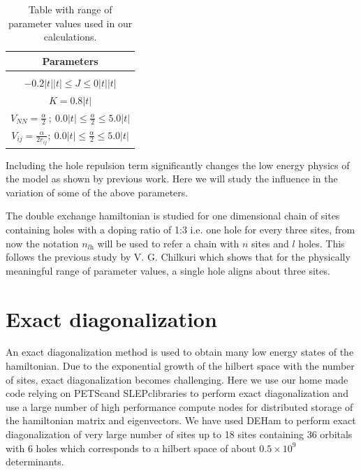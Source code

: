 \documentclass[12pt,twoside]{report}
\newcommand{\citepetsc}{\cite{petsc_web_page,petsc_user_ref,petsc_efficient}}
\newcommand{\citeslepc}{\cite{Hernandez_2003_SSL,slepc_users_manual}}
\begin{document}
	\begin{table}[h!]
		\centering
		\begin{tabular}{||c||}
			\hline
			Parameters  \\ [0.5ex]
			\hline\hline
			\\
			$ -0.2|t|\lvert t \rvert \le J \le 0|t|\lvert t \rvert $    \\ [1ex]
			$  K = 0.8 |t| $                                    \\ [1ex]
			$ V_{NN} = \frac{\alpha}{2}\ ;\ 0.0|t| \le \frac{\alpha}{2} \le 5.0|t| $ \\ [1ex]
			$ V_{ij} = \frac{\alpha}{2r_{ij}} ;\ 0.0|t| \le \frac{\alpha}{2} \le 5.0|t|$                                \\ [1ex]
			\hline
		\end{tabular}
		\label{tab:params}
		\caption{Table with range of parameter values used in our calculations.}
	\end{table}
	
	Including the hole repulsion term significantly changes the low energy physics
	of the model as shown by previous work\cite{calzado_proposal_2001}. Here we will
	study the influence in the variation of some of the above parameters.
	
	
	
	The double exchange hamiltonian is studied for one dimensional chain of
	sites containing holes with a doping ratio of 1:3 i.e. one hole for every
	three sites, from now the notation $n_{l\text{h}}$ will be used to refer a chain
	with $n$ sites and $l$ holes. This follows the previous study by V. G.
	Chilkuri which shows that for the physically meaningful range of parameter
	values, a single hole aligns about three sites.\cite{crystals_chilkuri}
	
	\section{Exact diagonalization}
	
	An exact diagonalization method is used to obtain many low energy states of
	the hamiltonian. Due to the exponential growth of the hilbert space with the
	number of sites, exact diagonalization becomes challenging. Here we use our
	home made code relying on PETSc\citepetsc and SLEPc\citeslepc libraries to
	perform exact diagonalization and use a large number of high performance
	compute nodes for distributed storage of the hamiltonian matrix and
	eigenvectors. We have used DEHam\cite{DEHamam} to perform exact
	diagonalization of very large number of sites up to 18 sites containing 36
	orbitals with 6 holes which corresponds to a hilbert space of about $0.5
	\times 10^9$ determinants.
	
\end{document}
